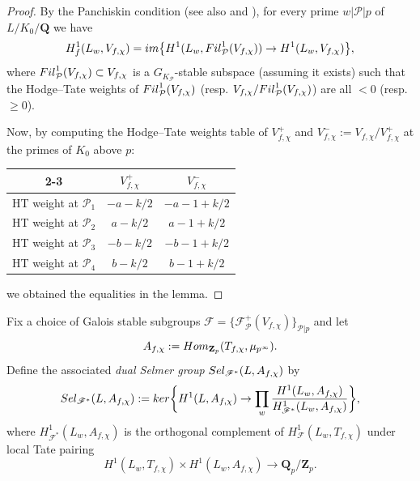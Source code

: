 \documentclass[10pt,letterpaper]{amsart}
\theoremstyle{plain}
\theoremstyle{definition}
\theoremstyle{definition}
\theoremstyle{plain}
\theoremstyle{plain}
\theoremstyle{plain}
\theoremstyle{remark}
\numberwithin{equation}{section}
\def\cP{{\mathcal P}}
\newcommand{\Q}{\mathbf{Q}}
\newcommand{\Z}{\mathbf{Z}}
\begin{document}
\begin{proof}
By the Panchiskin condition \cite[Thm 4.1(ii)]{BK} (see also \cite[(3.1)-(3.2)]{nekovarCRM} and \cite[Lem.\,2, p.\,125]{flach-CT}), for every prime $w\vert \cP\vert p$ of $L/K_0/\Q$  we have 
\[
H^1_f(L_w,V_{f,\chi})={\rm im}\bigl\{H^1(L_w,{\rm Fil}_{\cP}^1(V_{f,\chi}))\rightarrow H^1(L_w,V_{f,\chi})\bigr\},
\]
where ${\rm Fil}_{\cP}^1(V_{f,\chi})\subset V_{f,\chi}$  is a $G_{K_{\cP}}$-stable subspace (assuming it exists) such that the Hodge--Tate weights of ${\rm Fil}_{\cP}^1(V_{f,\chi})$ (resp. $V_{f,\chi}/{\rm Fil}_{\cP}^1(V_{f,\chi})$) are all $<0$  (resp. $\geq 0$).

Now, by computing the Hodge--Tate weights table of $V_{f,\chi}^+$ 
and $V_{f,\chi}^-:=V_{f,\chi}/V_{f,\chi}^{+}$ at the primes of $K_0$ above $p$:
\begin{center}
\begin{tabular}{c|c|c|}
\cline{2-3}
  & $V_{f,\chi}^+$ & $V_{f,\chi}^-$ \\
 \hline
\multicolumn{1}{|c|}{HT weight at $\cP_1$} & $-a-k/2$ & $-a-1+k/2$  \\
 \hline
 \multicolumn{1}{|c|}{HT weight at $\cP_2$} & $a-k/2$ & $a-1+k/2$  \\
 \hline
 \multicolumn{1}{|c|}{HT weight at $\cP_3$} & $-b-k/2$ & $-b-1+k/2$  \\
 \hline
 \multicolumn{1}{|c|}{HT weight at $\cP_4$} & $b-k/2$ & $b-1+k/2$  \\
 \hline
\end{tabular}
\end{center}
we obtained the equalities in the lemma.
\end{proof}

Fix a choice of Galois stable subgroups $\mathscr{F}=\{\mathscr{F}_{\cP}^+(V_{f,\chi})\}_{\cP\vert p}$ and let $$A_{f,\chi}:={\rm Hom}_{\Z_p}(T_{f,\chi},\mu_{p^\infty}).$$ %
Define the associated \emph{dual Selmer group} ${\rm Sel}_{\mathscr{F}^*}(L,A_{f,\chi})$ by
\[
{\rm Sel}_{\mathscr{F}^*}(L,A_{f,\chi}):={\rm ker}\biggl\{H^1(L,A_{f,\chi})\rightarrow\prod_{w}\frac{H^1(L_w,A_{f,\chi})}{H^1_{\mathscr{F}^*}(L_w,A_{f,\chi})}\biggr\},
\]
where $H^1_{\mathscr{F}^*}(L_w,A_{f,\chi})$ is the orthogonal complement of $H^1_{\mathscr{F}}(L_w,T_{f,\chi})$ under local Tate pairing
\[
H^1(L_w,T_{f,\chi})\times H^1(L_w,A_{f,\chi})\rightarrow\Q_p/\Z_p.
\]
\end{document}
